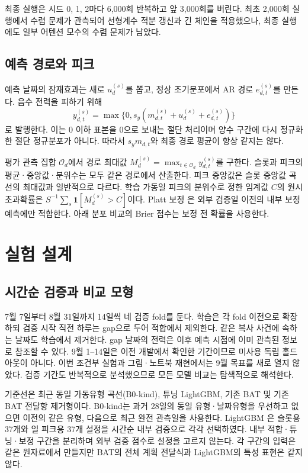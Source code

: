 \documentclass[letterpaper]{article}
\begin{document}
최종 실행은 시드 0, 1, 2마다 6,000회 반복하고 앞 3,000회를 버린다. 최초 2,000회 실행에서 수렴 문제가 관측되어 선형계수 적분 갱신과 긴 체인을 적용했으나, 최종 실행에도 일부 어텐션 모수의 수렴 문제가 남았다.

\subsection{예측 경로와 피크}
예측 날짜의 잠재효과는 새로 $u_d^{(s)}$를 뽑고, 정상 초기분포에서 AR 경로 $e_{d,t}^{(s)}$를 만든다. 음수 전력을 피하기 위해
\begin{equation}
 y_{d,t}^{(s)}=\max\{0,s_y(m_{d,t}^{(s)}+u_d^{(s)}+e_{d,t}^{(s)})\}
\label{eq:path}
\end{equation}
로 발행한다. 이는 0 이하 표본을 0으로 보내는 절단 처리이며 양수 구간에 다시 정규화한 절단 정규분포가 아니다. 따라서 $s_y m_{d,t}$와 최종 경로 평균이 항상 같지는 않다.

평가 관측 집합 $\mathcal O_d$에서 경로 최대값 $M_d^{(s)}=\max_{t\in\mathcal O_d}y_{d,t}^{(s)}$를 구한다. 슬롯과 피크의 평균·중앙값·분위수는 모두 같은 경로에서 산출한다. 피크 중앙값은 슬롯 중앙값 곡선의 최대값과 일반적으로 다르다. 학습 가동일 피크의 분위수로 정한 임계값 $C$의 원시 초과확률은 $S^{-1}\sum_s\mathbf{1}[M_d^{(s)}>C]$이다. Platt 보정 \citep{platt1999probabilistic}은 외부 검증일 이전의 내부 보정 예측에만 적합한다. 아래 분포 비교의 Brier 점수는 보정 전 확률을 사용한다.

\section{실험 설계}
\subsection{시간순 검증과 비교 모형}
7월 7일부터 8월 31일까지 14일씩 네 검증 fold를 둔다. 학습은 각 fold 이전으로 확장하되 검증 시작 직전 하루는 gap으로 두어 적합에서 제외한다. 같은 복사 사건에 속하는 날짜도 학습에서 제거한다. gap 날짜의 전력은 이후 예측 시점에 이미 관측된 정보로 참조할 수 있다. 9월 1--14일은 이전 개발에서 확인한 기간이므로 미사용 독립 홀드아웃이 아니다. 이번 조건부 실험과 그림·노트북 재현에서는 9월 목표를 새로 열지 않았다. 검증 기간도 반복적으로 분석했으므로 모든 모델 비교는 탐색적으로 해석한다.

기준선은 최근 동일 가동유형 곡선(B0-kind), 튜닝 LightGBM, 기존 BAT 및 기존 BAT 전달항 제거형이다. B0-kind는 과거 28일의 동일 유형·날짜유형을 우선하고 없으면 이전의 같은 유형, 다음으로 최근 완전 관측일을 사용한다. LightGBM \citep{ke2017lightgbm}은 슬롯용 37개와 일 피크용 37개 설정을 시간순 내부 검증으로 각각 선택하였다. 내부 적합·튜닝·보정 구간을 분리하며 외부 검증 점수로 설정을 고르지 않는다. 각 구간의 입력은 같은 원자료에서 만들지만 BAT의 전체 계획 전달식과 LightGBM의 특성 표현은 같지 않다.
\end{document}
